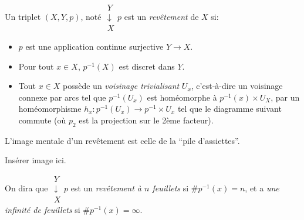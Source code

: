   \begin{defi} 
    Un triplet $(X,Y,p)$, noté $\substack{Y\\\downarrow\\ X}p$ est un \emph{revêtement} de $X$ si: 
    \begin{itemize}
    \item $p$ est une application continue surjective $Y \to X$.
    \item Pour tout $x \in X$, $p^{-1}(X)$ est discret dans $Y$.
    \item Tout $x \in X$ possède un \emph{voisinage trivialisant}  $U_x$,
      c'est-à-dire un voisinage connexe par arcs tel que $p^{-1}(U_x)$ est homéomorphe à $p^{-1}(x) \times
      U_X$, par un homéomorphisme $h_x: p^{-1}(U_x) \to p^{-1} \times U_x$ tel que le diagramme suivant
      commute (où $p_2$ est la projection sur le 2ème facteur).
    \end{itemize}
    L'image mentale d'un revêtement est celle de la ``pile d'assiettes''.

    \begin{center}
      Insérer image ici.
    \end{center}

    On dira que $\substack{Y\\\downarrow\\ X}p$ est un \emph{revêtement à $n$ feuillets}  si $\# p^{-1}(x) = n$, et a \emph{une infinité de feuillets} si $\# p^{-1}(x) = \infty$.
  \end{defi}

